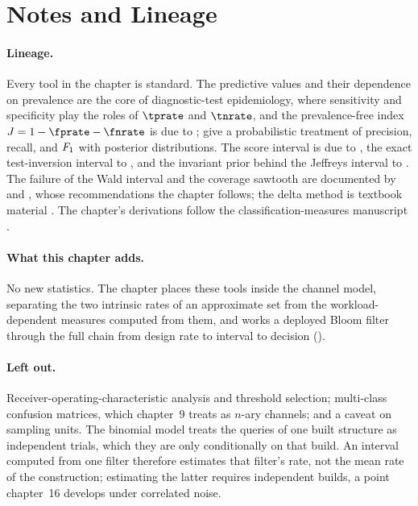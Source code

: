 %

\section{Notes and Lineage}
\label{sec:bib-notes-ch7}

\paragraph{Lineage.}
Every tool in the chapter is standard. The predictive values and their
dependence on prevalence are the core of diagnostic-test epidemiology, where
sensitivity and specificity play the roles of $\tprate$ and $\tnrate$, and the
prevalence-free
index $J = 1 - \fprate - \fnrate$ is due to \textcite{youden-1950};
\textcite{goutte-gaussier-2005} give a probabilistic treatment of precision,
recall, and $F_1$ with posterior distributions. The score interval is due
to \textcite{wilson-1927}, the exact test-inversion interval to
\textcite{clopper-pearson-1934}, and the invariant prior behind the Jeffreys
interval to \textcite{jeffreys-1946}. The failure of the Wald interval and
the coverage sawtooth are documented by \textcite{agresti-coull-1998} and
\textcite{brown-cai-dasgupta-2001}, whose recommendations the chapter
follows; the delta method is textbook material \parencite[Ch.~5]{casella-berger}.
The chapter's derivations follow the classification-measures manuscript
\textcite{towell-bernoulli-classification-measures}.

\paragraph{What this chapter adds.}
No new statistics. The chapter places these tools inside the channel model,
separating the two intrinsic rates of an approximate set from the
workload-dependent measures computed from them, and works a deployed Bloom
filter through the full chain from design rate to interval to decision
().

\paragraph{Left out.}
Receiver-operating-characteristic analysis and threshold selection;
multi-class confusion matrices, which chapter~9 treats as $n$-ary channels;
and a caveat on sampling units. The binomial model treats the queries of one
built structure as independent trials, which they are only conditionally on
that build. An interval computed from one filter therefore estimates that
filter's rate, not the mean rate of the construction; estimating the latter
requires independent builds, a point chapter~16 develops under correlated
noise.
